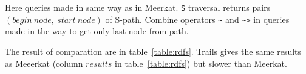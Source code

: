 Here queries made in same way as in Meerkat.
\lstinline{S} traversal returns pairs $(begin\ node,\ start\ node)$ of S-path.
Combine operators \lstinline{~} and \lstinline{~>} in queries made in the way to get only last node from path.




The result of comparation are in table~\ref{table:rdfs}.
Trails gives the same results as Meeerkat (column $results$ in table~\ref{table:rdfs}) but slower than Meerkat.

